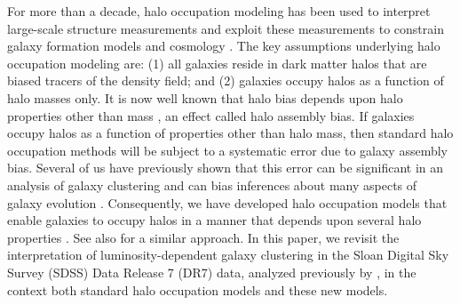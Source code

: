 \documentclass[usenatbib,usegraphicx,letterpaper]{mn2e}
\begin{document}
For more than a decade, halo occupation modeling has been used to
interpret large-scale structure measurements and exploit these
measurements to constrain galaxy formation models and cosmology
\citep[e.g.,][]{yang03,tinker05,zehavi05a,
  porciani06,vdBosch07,Zheng07,conroy_wechsler09,yang09b,zehavi_etal11,guo_etal11b,
  wake_etal11,yang11a,yang12,leauthaud_etal12,rod_puebla12,tinker_etal13,cacciato_etal13,
  more_etal13,guo_etal14,zu_mandelbaum15b}. The key assumptions
underlying halo occupation modeling are: (1) all galaxies reside in
dark matter halos that are biased tracers of the density field; and
(2) galaxies occupy halos as a function of halo masses only. It is now
well known that halo bias depends upon halo properties other than mass
\citep[e.g.][]{gao_etal05,wechsler06,gao_white07,zentner07,dalal_etal08,lacerna11},
an effect called halo assembly bias. If galaxies occupy halos as a
function of properties other than halo mass, then standard halo
occupation methods will be subject to a systematic error due to galaxy
assembly bias. Several of us have previously shown that this error can
be significant in an analysis of galaxy clustering and can bias
inferences about many aspects of galaxy evolution
\citep{zentner_etal14}. Consequently, we have developed halo
occupation models that enable galaxies to occupy halos in a manner
that depends upon several halo properties \citep{hearin_etal16}.  See
also \citet{Yao_etalXX} for a similar approach. In this paper, we
revisit the interpretation of luminosity-dependent galaxy clustering
in the Sloan Digital Sky Survey (SDSS) Data Release 7 (DR7) data,
analyzed previously by \citet{zehavi_etal11}, in the context both
standard halo occupation models and these new models.
\end{document}
